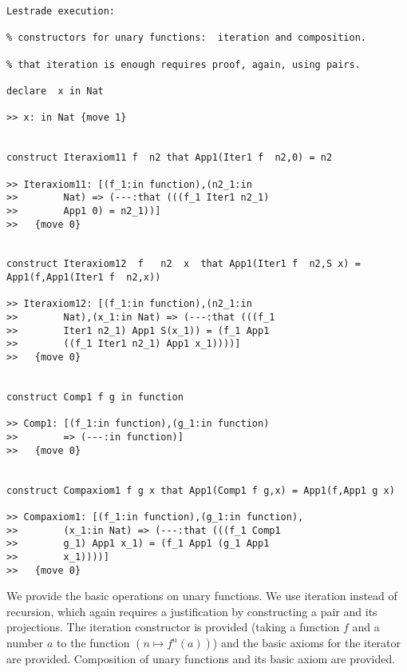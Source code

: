 \documentclass[12pt]{article}
\begin{document}
\begin{verbatim}Lestrade execution:

% constructors for unary functions:  iteration and composition.

% that iteration is enough requires proof, again, using pairs.

declare  x in Nat

>> x: in Nat {move 1}


construct Iteraxiom11 f  n2 that App1(Iter1 f  n2,0) = n2

>> Iteraxiom11: [(f_1:in function),(n2_1:in 
>>        Nat) => (---:that (((f_1 Iter1 n2_1) 
>>        App1 0) = n2_1))]
>>   {move 0}


construct Iteraxiom12  f   n2  x  that App1(Iter1 f  n2,S x) = App1(f,App1(Iter1 f  n2,x))

>> Iteraxiom12: [(f_1:in function),(n2_1:in 
>>        Nat),(x_1:in Nat) => (---:that (((f_1 
>>        Iter1 n2_1) App1 S(x_1)) = (f_1 App1 
>>        ((f_1 Iter1 n2_1) App1 x_1))))]
>>   {move 0}


construct Comp1 f g in function

>> Comp1: [(f_1:in function),(g_1:in function) 
>>        => (---:in function)]
>>   {move 0}


construct Compaxiom1 f g x that App1(Comp1 f g,x) = App1(f,App1 g x)

>> Compaxiom1: [(f_1:in function),(g_1:in function),
>>        (x_1:in Nat) => (---:that (((f_1 Comp1 
>>        g_1) App1 x_1) = (f_1 App1 (g_1 App1 
>>        x_1))))]
>>   {move 0}

\end{verbatim}

We provide the basic operations on unary functions.  We use iteration instead of recursion, which again requires a justification by constructing a pair and its projections.  The iteration constructor is provided (taking a function $f$ and a number $a$ to the function $(n \mapsto f^n(a))$) and the basic axioms for the iterator are provided.  Composition of unary functions and its basic axiom are provided.
\end{document}
